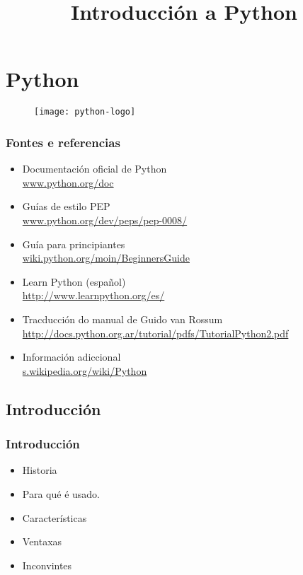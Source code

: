 
\title[Python]{Introducción a Python}
\date{}
\author[Fran Rúa/Breixo Camiña]{}
\institute{}

\section{Python}
\label{sec:Python}

\usebackgroundtemplate{}
\begin{frame}
  \titlepage
  \begin{figure}[H]
    \centering
    \texttt{[image: python-logo]}
  \end{figure}
\end{frame}


\begin{frame}
  \frametitle{Fontes e referencias}
  \begin{itemize}
  \item Documentación oficial de Python\\
    {\color{blue}\url{www.python.org/doc}}
  \item Guías de estilo PEP\\
    {\color{blue}\url{www.python.org/dev/peps/pep-0008/}}
  \item Guía para principiantes\\
    {\color{blue}\url{wiki.python.org/moin/BeginnersGuide}}
  \item Learn Python (español)\\
    {\color{blue}\url{http://www.learnpython.org/es/}}
  \item Tracducción do manual de Guido van Rossum
    {\color{blue}\url{http://docs.python.org.ar/tutorial/pdfs/TutorialPython2.pdf}}
  \item Información adiccional\\
    {\color{blue}\url{s.wikipedia.org/wiki/Python}}
  \end{itemize}
\end{frame}

\subsection{Introducción}
\label{subsec:Introduccion}

\begin{frame}
  \frametitle{Introducción}
  \begin{itemize}
  \item Historia
  \item Para qué é usado.
  \item Características
  \item Ventaxas
  \item Inconvintes
  \end{itemize}
\end{frame}

